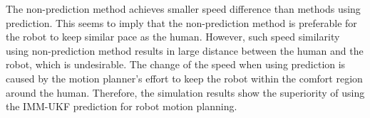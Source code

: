 \documentclass[letterpaper, 10 pt, conference]{ieeeconf}
\begin{document}
	
	The non-prediction method achieves smaller speed difference than methods using prediction.
	This seems to imply that the non-prediction method is preferable for the robot to keep similar pace as the human.
	However, such speed similarity using non-prediction method results in large distance between the human and the robot, which is undesirable.
	The change of the speed when using prediction is caused by the motion planner's effort to keep the robot within the comfort region around the human.
	Therefore, the simulation results show the superiority of using the IMM-UKF prediction for robot motion planning.
	
\end{document}
